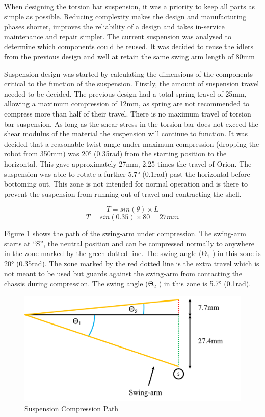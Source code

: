 When designing the torsion bar suspension, it was a priority to keep all parts as simple as possible. Reducing complexity makes the design and manufacturing phases shorter, improves the reliability of a design and takes in-service maintenance and repair simpler. The current suspension was analysed to determine which components could be reused. It was decided to reuse the idlers from the previous design and well at retain the same swing arm length of 80mm \par

Suspension design was started by calculating the dimensions of the components critical to the function of the suspension. Firstly, the amount of suspension travel needed to be decided. The previous design had a total spring travel of 25mm, allowing a maximum compression of 12mm, as spring are not recommended to compress more than half of their travel. There is no maximum travel of torsion bar suspension. As long as the shear stress in the torsion bar does not exceed the shear modulus of the material the suspension will continue to function. It was decided that a reasonable twist angle under maximum compression (dropping the robot from 350mm) was 20° (0.35rad) from the starting position to the horizontal. This gave approximately 27mm, 2.25 times the travel of Orion. The suspension was able to rotate a further 5.7° (0.1rad) past the horizontal before bottoming out. This zone is not intended for normal operation and is there to prevent the suspension from running out of travel and contracting the shell.\par

\[T= sin(\theta) \times L \]\[T = sin(0.35) \times 80 = 27mm\]

Figure \ref{fig:SwingDiag} shows the path of the swing-arm under compression. The swing-arm starts at “S”, the neutral position and can be compressed normally to anywhere in the zone marked by the green dotted line. The swing angle (Θ$_1$ ) in this zone is 20° (0.35rad). The zone marked by the red dotted line is the extra travel which is not meant to be used but guards against the swing-arm from contacting the chassis during compression. The swing angle (Θ$_2$ ) in this zone is 5.7° (0.1rad).

\begin{figure}[h]
\centering\includegraphics[width=0.6\linewidth]{Images/MaxImages/Swing_Diag.png}
\caption{Suspension Compression Path}
\label{fig:SwingDiag}
\end{figure}

